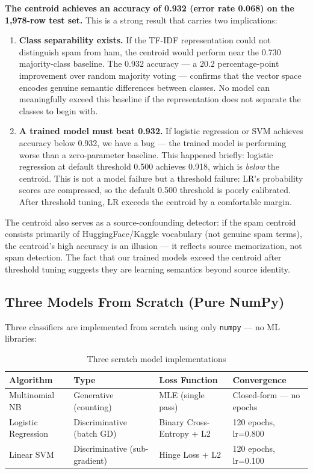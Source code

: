 \textbf{The centroid achieves an accuracy of 0.932 (error rate 0.068) on the 1,978-row test set.} This is a strong result that carries two implications:

\begin{enumerate}
  \item \textbf{Class separability exists.} If the TF-IDF representation could not distinguish spam from ham, the centroid would perform near the 0.730 majority-class baseline. The 0.932 accuracy — a 20.2 percentage-point improvement over random majority voting — confirms that the vector space encodes genuine semantic differences between classes. No model can meaningfully exceed this baseline if the representation does not separate the classes to begin with.
  \item \textbf{A trained model must beat 0.932.} If logistic regression or SVM achieves accuracy below 0.932, we have a bug — the trained model is performing worse than a zero-parameter baseline. This happened briefly: logistic regression at default threshold 0.500 achieves 0.918, which is \textit{below} the centroid. This is not a model failure but a threshold failure: LR's probability scores are compressed, so the default 0.500 threshold is poorly calibrated. After threshold tuning, LR exceeds the centroid by a comfortable margin.
\end{enumerate}

The centroid also serves as a source-confounding detector: if the spam centroid consists primarily of HuggingFace/Kaggle vocabulary (not genuine spam terms), the centroid's high accuracy is an illusion — it reflects source memorization, not spam detection. The fact that our trained models exceed the centroid after threshold tuning suggests they are learning semantics beyond source identity.

\subsection{Three Models From Scratch (Pure NumPy)}

Three classifiers are implemented from scratch using only \texttt{numpy} — no ML libraries:

\begin{table}[H]
\centering{}
\begin{tabular}{L{3cm} L{3.5cm} L{4.5cm} L{3.5cm}}
\toprule{}\color{white}\textbf{Algorithm} &\color{white}\textbf{Type} &\color{white}\textbf{Loss Function} &\color{white}\textbf{Convergence}\\
\midrule
Multinomial NB & Generative (counting) & MLE (single pass) & Closed-form — no epochs\\
Logistic Regression & Discriminative (batch GD) & Binary Cross-Entropy + L2 & 120 epochs, lr=0.800\\
Linear SVM & Discriminative (sub-gradient) & Hinge Loss + L2 & 120 epochs, lr=0.100\\
\bottomrule
\end{tabular}
\caption{Three scratch model implementations}
\end{table}

